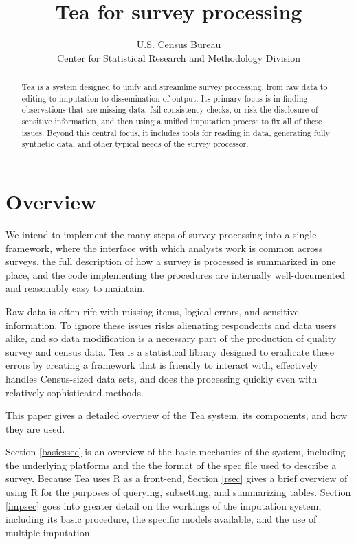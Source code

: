 \documentclass{article}
\begin{document}
\author{U.S. Census Bureau\\Center for Statistical Research and Methodology Division}
\title{Tea for survey processing}
\maketitle

\begin{abstract}
Tea is a system designed to unify and streamline survey processing, from raw data to
editing to imputation to dissemination of output. Its primary focus is in finding 
observations that are missing data, fail consistency checks, or risk the disclosure of
sensitive information, and then using a unified imputation process to fix all of these
issues. Beyond this central focus, it includes tools for reading in data, generating
fully synthetic data, and other typical needs of the survey processor.
\end{abstract}


\section{Overview}
{\sc We intend} to implement the many steps of survey processing into a single
framework, where the interface with which analysts work is common across surveys,
the full description of how a survey is processed is summarized in one place, and the
code implementing the procedures are internally well-documented and reasonably easy
to maintain.

Raw data is often rife with missing items, logical errors, and sensitive information. 
To ignore these issues risks alienating respondents and data users alike, and so data 
modification is a necessary part of the production of quality survey and census data. 
Tea is a statistical library designed to eradicate these errors by creating a framework 
that is friendly to interact with, effectively handles Census-sized data sets, and does 
the processing quickly even with relatively sophisticated methods.

This paper gives a detailed overview of the Tea system, its components, and how they are 
used. 

Section \ref{basicssec} is an overview of the basic mechanics of the system, including the
underlying platforms and the the format of the spec file used to describe a survey.
Because Tea uses R as a front-end, Section \ref{rsec} gives a brief overview of using R
for the purposes of querying, subsetting, and summarizing tables.
Section \ref{impsec} goes into greater detail on the workings of the imputation system,
including its basic procedure, the specific models available, and the use of multiple imputation.
\end{document}
